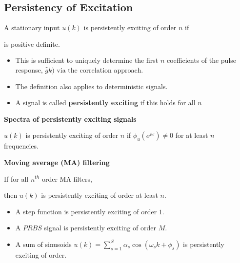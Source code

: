 \documentclass[10pt,a4paper]{scrartcl}
\newcommand{\ejo}{(e^{j\omega})}
\begin{document}
\begin{multicols*}{2}
\subsection{Persistency of Excitation}

A stationary input $u(k)$ is persistently exciting of order $n$ if


is positive definite.

\begin{itemize}
\item This is sufficient to uniquely determine the first $n$ coefficients of the pulse response, $\hat{g}k)$ via the correlation approach.
\item The definition also applies to deterministic signals.
\item A signal is called \textbf{persistently exciting} if this holds for all $n$
\end{itemize}

\textbf{Spectra of persistently exciting signals}

$u(k)$ is persistently exciting of order $n$ if $\phi_u\ejo\neq 0$ for at least $n$ frequencies.

\textbf{Moving average (MA) filtering}


If for all $n^{th}$ order MA filters,

\mportant{$|M_n\ejo|^2\phi(u)\ejo = 0\Rightarrow M\ejo = 0$}

then $u(k)$ is persistently exciting of order at least $n$.

\begin{itemize}
\item A step function is persistently exciting of order $1$.
\item A $PRBS$ signal is persistently exciting of order $M$.
\item A sum of sinusoids $u(k)=\sum\limits_{s=1}^S\alpha_s\cos(\omega_s k+\phi_s)$ is persistently exciting of order.
\end{itemize}



\end{multicols*}
\end{document}
